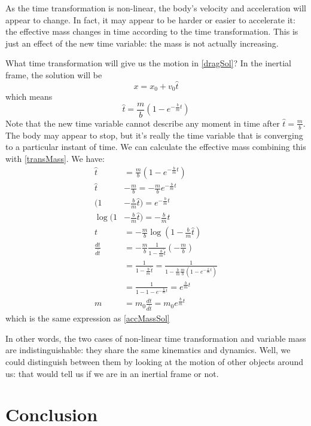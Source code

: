 \documentclass[aps,pra,10pt,floatfix,nofootinbib]{revtex4-1}
\theoremstyle{definition}
\begin{document}
As the time transformation is non-linear, the body's velocity and acceleration will appear to change. In fact, it may appear to be harder or easier to accelerate it: the effective mass changes in time according to the time transformation. This is just an effect of the new time variable: the mass is not actually increasing.

What time transformation will give us the motion in \eqref{dragSol}? In the inertial frame, the solution will be
\begin{equation}
x=x_0+v_0\hat{t}
\end{equation}
which means
\begin{equation}
\hat{t} = \frac{m}{b}(1-e^{-\frac{b}{m}t})
\end{equation}
Note that the new time variable cannot describe any moment in time after $\hat{t} = \frac{m}{b}$. The body may appear to stop, but it's really the time variable that is converging to a particular instant of time. We can calculate the effective mass combining this with \eqref{transMass}. We have:
\begin{align*}
\hat{t} &= \frac{m}{b}(1-e^{-\frac{b}{m}t}) \\
\hat{t} &- \frac{m}{b} = -\frac{m}{b}e^{-\frac{b}{m}t} \\
(1&- \frac{b}{m}\hat{t}) = e^{-\frac{b}{m}t} \\
\log(1&- \frac{b}{m}\hat{t})= -\frac{b}{m}t \\
t&= -\frac{m}{b}\log(1- \frac{b}{m}\hat{t}) \\
\frac{dt}{d\hat{t}} &= -\frac{m}{b} \frac{1}{1- \frac{b}{m}\hat{t}} (-\frac{m}{b})  \\
&= \frac{1}{1- \frac{b}{m}\hat{t}}
= \frac{1}{1- \frac{b}{m}\frac{m}{b}(1-e^{-\frac{b}{m}t})} \\
&=\frac{1}{1-1-e^{-\frac{b}{m}t}} =e^{\frac{b}{m}t} \\
m&=m_0\frac{dt}{d\hat{t}}=m_0e^{\frac{b}{m}t}
\end{align*}
which is the same expression as \eqref{accMassSol}

In other words, the two cases of non-linear time transformation and variable mass are indistinguishable: they share the same kinematics and dynamics. Well, we could distinguish between them by looking at the motion of other objects around us: that would tell us if we are in an inertial frame or not.

\section{Conclusion}
\end{document}
